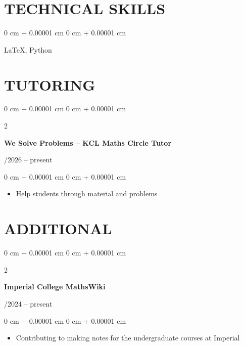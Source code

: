 \documentclass[10pt, letterpaper]{article}
\newenvironment{highlights}{
    \begin{itemize}[
        topsep=0.10 cm,
        parsep=0.10 cm,
        partopsep=0pt,
        itemsep=0pt,
        leftmargin=0 cm + 10pt
    ]
}{
    \end{itemize}
}
\newenvironment{onecolentry}{
    \begin{adjustwidth}{
        0 cm + 0.00001 cm
    }{
        0 cm + 0.00001 cm
    }
}{
    \end{adjustwidth}
}
\newenvironment{twocolentry}[2][]{
    \onecolentry
    \def\secondColumn{#2}
    \setcolumnwidth{\fill, 4.5 cm}
    \begin{paracol}{2}
}{
    \switchcolumn \raggedleft \secondColumn
    \end{paracol}
    \endonecolentry
} %
\begin{document}
    \section{TECHNICAL SKILLS}

        \begin{onecolentry}{
            
        }
            \LaTeX, Python
        \end{onecolentry}

        \vspace{0.2 cm}

    \section{TUTORING}

        \begin{twocolentry}{
            01/2026 -- present
        }
            \textbf{We Solve Problems -- KCL Maths Circle Tutor}
        \end{twocolentry}

        \vspace{0.10 cm}
        \begin{onecolentry}
            \begin{highlights}
                \item Help students through material and problems
            \end{highlights}
        \end{onecolentry}

        \vspace{0.2 cm}

    \section{ADDITIONAL}

        \begin{twocolentry}{
            10/2024 -- present
        }
            \textbf{Imperial College MathsWiki}
        \end{twocolentry}

        \vspace{0.10 cm}
        \begin{onecolentry}
            \begin{highlights}
                \item Contributing to making notes for the undergraduate courses at Imperial
            \end{highlights}
        \end{onecolentry}
\end{document}
